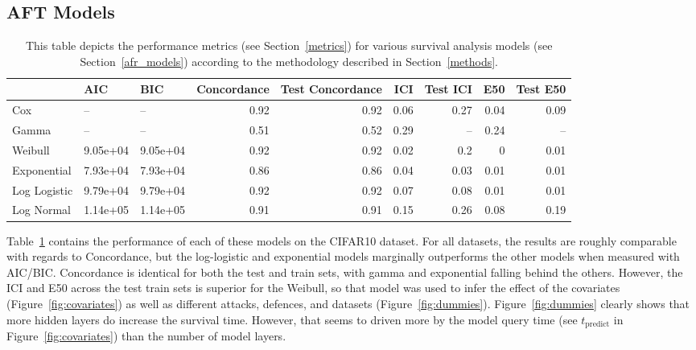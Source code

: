 \subsection{AFT Models}

\begin{table}[!ht]
\centering
\begin{tabular}{lllrrrrrr}
\toprule
 & AIC & BIC & Concordance & Test Concordance & ICI & Test ICI & E50 & Test E50 \\
\midrule
Cox & -- & -- & 0.92 & 0.92 & 0.06 & 0.27 & 0.04 & 0.09 \\
Gamma & -- & -- & 0.51 & 0.52 & 0.29 & -- & 0.24 & -- \\
Weibull & 9.05e+04 & 9.05e+04 & 0.92 & 0.92 & 0.02 & 0.2 & 0 & 0.01 \\
Exponential & 7.93e+04 & 7.93e+04 & 0.86 & 0.86 & 0.04 & 0.03 & 0.01 & 0.01 \\
Log Logistic & 9.79e+04 & 9.79e+04 & 0.92 & 0.92 & 0.07 & 0.08 & 0.01 & 0.01 \\
Log Normal & 1.14e+05 & 1.14e+05 & 0.91 & 0.91 & 0.15 & 0.26 & 0.08 & 0.19 \\
\bottomrule
\end{tabular}
\caption{This table depicts the performance metrics (see Section~\ref{metrics}) for various survival analysis models (see Section~\ref{afr_models}) according to the methodology described in Section~\ref{methods}.}
\label{tab:afr_summary}
\end{table}

Table~\ref{tab:afr_summary} contains the performance of each of these models on the CIFAR10 dataset. For all datasets, the results are roughly comparable with regards to Concordance, but the log-logistic and exponential models marginally outperforms the other models when measured with AIC/BIC\@. Concordance is identical for both the test and train sets, with gamma and exponential falling behind the others. However, the ICI and E50 across the test train sets is superior for the Weibull, so that model was used to infer the effect of the covariates (Figure~\ref{fig:covariates}) as well as different attacks, defences, and datasets (Figure~\ref{fig:dummies}). Figure~\ref{fig:dummies} clearly shows that more hidden layers do increase the survival time. However, that seems to driven more by the model query time (see $t_{\mathrm{predict}}$ in Figure~\ref{fig:covariates}) than the number of model layers.

